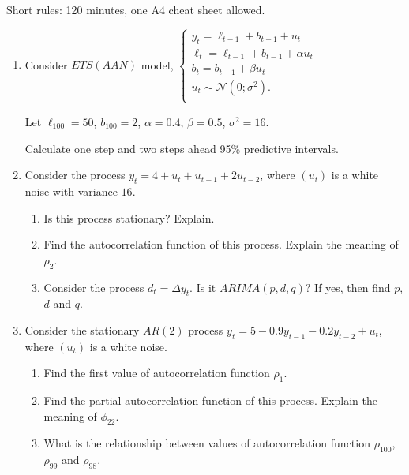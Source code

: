 \documentclass[12pt]{article}
\newcommand \cN{\mathcal{N}}
\begin{document}
Short rules: 120 minutes, one A4 cheat sheet allowed. 



\begin{enumerate}

\item Consider $ETS(AAN)$ model,
	$
	\begin{cases}
	y_t = \ell_{t-1} + b_{t-1} + u_t \\
	\ell_t = \ell_{t-1} + b_{t-1} + \alpha u_t \\
	b_t = b_{t-1} + \beta u_t \\
	u_t \sim \cN(0;\sigma^2). \\
	\end{cases}
	$
		
Let $\ell_{100} = 50$, $b_{100} = 2$, $\alpha=0.4$, $\beta=0.5$, $\sigma^2 = 16$.

Calculate one step and two steps ahead 95\% predictive intervals. 

\item Consider the process $y_t = 4 + u_t + u_{t-1} + 2 u_{t-2}$, where $(u_t)$ is a white noise with variance $16$.

\begin{enumerate}
	\item Is this process stationary? Explain. 
	\item Find the autocorrelation function of this process. Explain the meaning of $\rho_2$.
	\item Consider the process $d_t = \Delta y_t$. Is it $ARIMA(p, d, q)$? If yes, then find $p$, $d$ and $q$.
\end{enumerate}

\item Consider the stationary $AR(2)$ process $y_t = 5 - 0.9y_{t-1} - 0.2y_{t-2} + u_t$, where $(u_t)$ is a white noise. 
\begin{enumerate}
	\item Find the first value of autocorrelation function $\rho_1$.
	\item Find the partial autocorrelation function of this process. Explain the meaning of $\phi_{22}$.
	\item What is the relationship between values of autocorrelation function $\rho_{100}$, $\rho_{99}$ and $\rho_{98}$.
\end{enumerate}


\end{enumerate}
\end{document}
